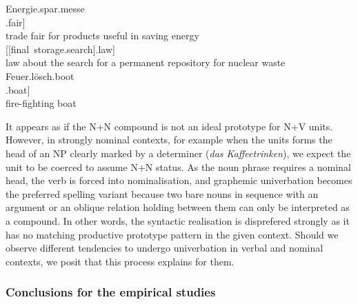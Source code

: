 \documentclass[biblatex, charis, linguex]{glossa}\usepackage{knitr}
\begin{document}
\begin{exe}
  \ex\label{ex:notfuhrhop}\begin{xlist}
    \ex\gll Energie.spar.messe\\
    [[energy.save].fair]\\
    \trans trade fair for products useful in saving energy
    \ex{}\\
    {[[final~storage.search].law]}\\
    \trans law about the search for a permanent repository for nuclear waste
    \ex\gll Feuer.lösch.boot\\
    [[fire.extinguish].boat]\\
    \trans fire-fighting boat
  \end{xlist}
  \ex\label{ex:nnv}
    \begin{xlist}
      \label{ex:nnva}
      \label{ex:nnvb}
    \end{xlist}
\end{exe}

It appears as if the N+N compound is not an ideal prototype for N+V units.
However, in strongly nominal contexts, for example when the units forms the head of an NP clearly marked by a determiner (\textit{das Kaffeetrinken}), we expect the unit to be coerced to assume N+N status.
As the noun phrase requires a nominal head, the verb is forced into nominalisation, and graphemic univerbation becomes the preferred spelling variant because two bare nouns in sequence with an argument or an oblique relation holding between them can only be interpreted as a compound.
In other words, the syntactic realisation is disprefered strongly as it has no matching productive prototype pattern in the given context.
Should we observe different tendencies to undergo univerbation in verbal and nominal contexts, we posit that this process explains for them.

\subsubsection{Conclusions for the empirical studies}
\label{sub:hypothesesfortheempiricalstudies}
\end{document}
